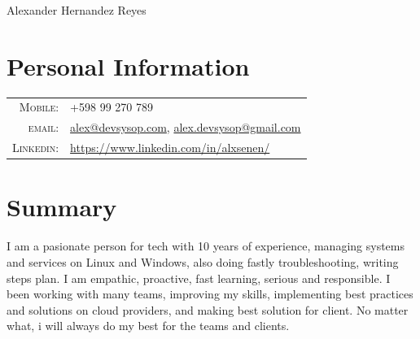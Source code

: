 \documentclass[a4paper,12pt]{article}
\begin{document}
\vspace*{-0.5cm}

\pagestyle{empty} %

{\huge Alexander Hernandez Reyes}
\hfill
{}\\
\section{Personal Information}
\begin{tabular}{rl}
    \textsc{Mobile:}    & +598 99 270 789 \\
    \textsc{email:}     & \href{mailto:alex@devsysop.com}{alex@devsysop.com}, \href{mailto:alex.devsysop@gmail.com}{alex.devsysop@gmail.com} \\
    \textsc{Linkedin:}  & \href{https://www.linkedin.com/in/alxsenen/}{https://www.linkedin.com/in/alxsenen/} \\
\end{tabular}

\section{Summary}
\justify
I am a pasionate person for tech with 10 years of experience, managing systems and services on Linux and Windows, also doing fastly troubleshooting, writing steps plan. I am empathic, proactive, fast learning, serious and responsible.
I been working with many teams, improving my skills, implementing best practices and solutions on cloud providers, and making best solution for client. No matter what, i will always do my best for the teams and clients.

\end{document}
